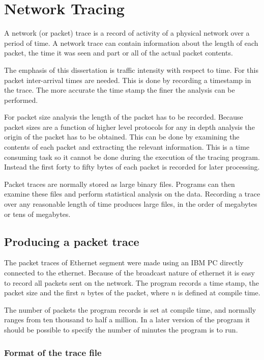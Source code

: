\chapter{Network Tracing}

A network (or packet) trace is a record of activity of a physical
network over a period of time.  A network trace can contain
information about the length of each packet, the time it was seen and
part or all of the actual packet contents.

The emphasis of this dissertation is traffic intensity with respect to
time.  For this packet inter-arrival times are needed.  This is done
by recording a timestamp in the trace.  The more accurate the time
stamp the finer the analysis can be performed.

For packet size analysis the length of the packet has to be recorded.
Because packet sizes are a function of higher level protocols for any
in depth analysis the origin of the packet has to be obtained.  This
can be done by examining the contents of each packet and extracting
the relevant information.  This is a time consuming task so it cannot
be done during the execution of the tracing program.  Instead the
first forty to fifty bytes of each packet is recorded for later
processing.

Packet traces are normally stored as large binary files.  Programs can
then examine these files and perform statistical analysis on the data.
Recording a trace over any reasonable length of time produces large
files, in the order of megabytes or tens of megabytes.

\section{Producing a packet trace}

The packet traces of Ethernet segment were made using an IBM PC
directly connected to the ethernet.  Because of the broadcast nature
of ethernet it is easy to record all packets sent on the network.  The
program records a time stamp, the packet size and the first $n$ bytes
of the packet, where $n$ is defined at compile time.

The number of packets the program records is set at compile time, and
normally ranges from ten thousand to half a million.  In a later version
of the program it should be possible to specify the number of minutes
the program is to run.

\subsection{Format of the trace file}

